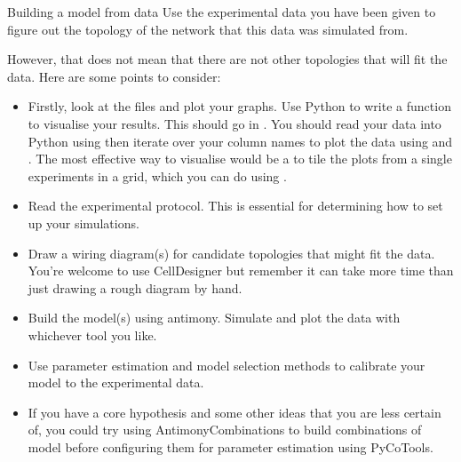 \documentclass[../../main]{subfiles}
\begin{document}
    \begin{Task}{Building a model from data}
        Use the experimental data you have been given to figure out the
        topology of the network that this data was simulated from.

        However, that does not mean that there are not other topologies that will fit the data.
        Here are some points to consider:
        \begin{itemize}
            \item Firstly, look at the  files and plot your graphs. Use Python to
            write a function to visualise your results. This should go in .
            You should read your data into Python using  then iterate
            over your column names to plot the data using  and .
            The most effective way to visualise would be a to tile the plots from a
            single experiments in a grid, which you can do using .
            \item Read the experimental protocol. This is essential for determining how to set up your
            simulations.
            \item Draw a wiring diagram(s) for candidate topologies that might fit the data. You're welcome
            to use CellDesigner but remember it can take more time than just drawing a rough diagram
            by hand.
            \item Build the model(s) using antimony. Simulate and plot the data with whichever tool you like.
            \item Use parameter estimation and model selection methods to calibrate your model to the experimental data.
            \item If you have a core hypothesis and some other ideas that you are less certain of, you
            could try using AntimonyCombinations to build combinations of model before configuring them
            for parameter estimation using PyCoTools.
        \end{itemize}


    \end{Task}
\end{document}
